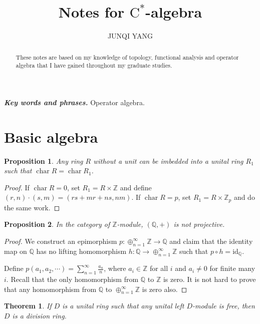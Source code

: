 \documentclass{article}
\title{Notes for $\mathrm{C}^*$-algebra}
\author{JUNQI YANG}
\affil{School of Mathematical Sciences, Tongji University, Shanghai, 200092, China\\
(e-mail: yjq24@live.cn)}
\newtheorem{theorem}{Theorem}[section]
\newtheorem{proposition}{Proposition}[section]
\DeclareMathOperator{\charct}{char}
\providecommand{\keywords}[1]{\textbf{\textit{Key words and phrases.}} #1}
\begin{document}
\maketitle

\begin{abstract}
These notes are based on my knowledge of topology, functional analysis and operator algebra that I have gained throughout my graduate studies.
\end{abstract}
\keywords{Operator algebra.}


\section{Basic algebra}

\begin{proposition}
Any ring $R$ without a unit can be imbedded into a unital ring $R_1$ such that $\charct R = \charct R_1$.
\end{proposition}

\begin{proof}
If $\charct R = 0$, set $R_1 = R \times \mathbb{Z}$ and define $(r,n) \cdot (s,m) = (rs + mr + ns, nm)$.
If $\charct R = p$, set $R_1 = R \times \mathbb{Z}_p$ and do the same work.
\end{proof}

\begin{proposition}
In the category of $\mathbb{Z}$-module, $(\mathbb{Q},+)$ is not projective.
\end{proposition}

\begin{proof}
We construct an epimorphism  $p:\oplus_{n=1}^\infty \mathbb{Z} \to \mathbb{Q}$ and claim that the identity map on $\mathbb{Q}$ has no lifting homomorphism $h : \mathbb{Q} \to \oplus_{n=1}^\infty \mathbb{Z}$ such that $p\circ h = \text{id}_\mathbb{Q}$.

Define $p (a_1,a_2,\cdots) = \sum_{n=1}^{\infty} \frac{a_n}{n}$, where $a_i \in \mathbb{Z}$ for all $i$ and $a_i \ne 0$ for finite many $i$.
Recall that the only homomorphism from $\mathbb{Q}$ to $\mathbb{Z}$ is zero. It is not hard to prove that any homomorphism from $\mathbb{Q}$ to $\oplus_{n=1}^\infty \mathbb{Z}$ is zero also. 
\end{proof}

\begin{theorem}
If $D$ is a unital ring such that any unital left $D$-module is free, then $D$ is a division ring.
\end{theorem}
\end{document}

